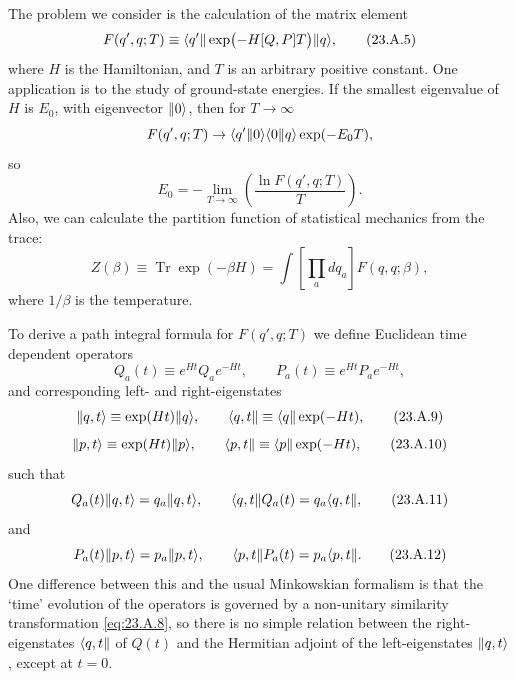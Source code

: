 The problem we consider is the calculation of the matrix element
\begin{equation}
 F(q',q;T)\equiv\langle q'\rVert\exp\bigl(-H[Q,P]T\bigr)\lVert q\rangle,
 \tag{23.A.5}\label{eq:23.A.5}
\end{equation}
where $H$ is the Hamiltonian, and $T$ is an arbitrary positive constant. One application is to the study of ground-state energies. If the smallest eigenvalue of $H$ is $E_0$, with eigenvector $\lVert 0\rangle$, then for $T\to\infty$
\[
 F(q',q;T)\to\langle q'\Vert 0\rangle\langle 0\Vert q\rangle\exp(-E_0T),
\]
so
\begin{equation}
 E_0=-\lim_{T\to\infty}\left(\frac{\ln F(q',q;T)}{T}\right).
 \tag{23.A.6}\label{eq:23.A.6}
\end{equation}
Also, we can calculate the partition function of statistical mechanics from the trace:
\begin{equation}
 Z(\beta)\equiv\operatorname{Tr}\exp(-\beta H)
 =\int\left[\prod_a dq_a\right]F(q,q;\beta),
 \tag{23.A.7}\label{eq:23.A.7}
\end{equation}
where $1/\beta$ is the temperature.

To derive a path integral formula for $F(q',q;T)$ we define Euclidean time dependent operators
\begin{equation}
 Q_a(t)\equiv e^{Ht}Q_ae^{-Ht},
 \qquad
 P_a(t)\equiv e^{Ht}P_ae^{-Ht},
 \tag{23.A.8}\label{eq:23.A.8}
\end{equation}
and corresponding left- and right-eigenstates
\begin{equation}
 \lVert q,t\rangle\equiv\exp(Ht)\lVert q\rangle,
 \qquad
 \langle q,t\rVert\equiv\langle q\rVert\exp(-Ht),
 \tag{23.A.9}\label{eq:23.A.9}
\end{equation}
\begin{equation}
 \lVert p,t\rangle\equiv\exp(Ht)\lVert p\rangle,
 \qquad
 \langle p,t\rVert\equiv\langle p\rVert\exp(-Ht),
 \tag{23.A.10}\label{eq:23.A.10}
\end{equation}
such that
\begin{equation}
 Q_a(t)\lVert q,t\rangle=q_a\lVert q,t\rangle,
 \qquad
 \langle q,t\rVert Q_a(t)=q_a\langle q,t\rVert,
 \tag{23.A.11}\label{eq:23.A.11}
\end{equation}
and
\begin{equation}
 P_a(t)\lVert p,t\rangle=p_a\lVert p,t\rangle,
 \qquad
 \langle p,t\rVert P_a(t)=p_a\langle p,t\rVert.
 \tag{23.A.12}\label{eq:23.A.12}
\end{equation}
One difference between this and the usual Minkowskian formalism is that the `time' evolution of the operators is governed by a non-unitary similarity transformation \eqref{eq:23.A.8}, so there is no simple relation between the right-eigenstates $\langle q,t\rVert$ of $Q(t)$ and the Hermitian adjoint of the left-eigenstates $\lVert q,t\rangle$, except at $t=0$.

